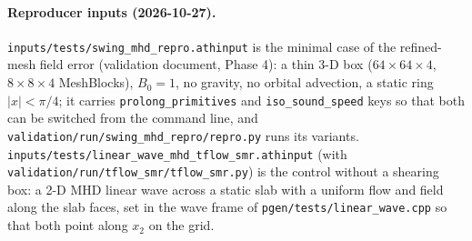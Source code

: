 \documentclass[11pt]{article}
\newcommand{\code}[1]{\texttt{#1}}
\newcommand{\file}[1]{\texttt{\small #1}}
\begin{document}
\paragraph{Reproducer inputs (2026-10-27).} \file{inputs/tests/swing\_mhd\_repro.athinput} is
the minimal case of the refined-mesh field error (validation document, Phase 4): a thin 3-D
box ($64\times64\times4$, $8\times8\times4$ MeshBlocks), $B_0 = 1$, no gravity, no orbital
advection, a static ring $|x| < \pi/4$; it carries \code{prolong\_primitives} and
\code{iso\_sound\_speed} keys so that both can be switched from the command line, and
\file{validation/run/swing\_mhd\_repro/repro.py} runs its variants.
\file{inputs/tests/linear\_wave\_mhd\_tflow\_smr.athinput} (with
\file{validation/run/tflow\_smr/tflow\_smr.py}) is the control without a shearing box: a 2-D
MHD linear wave across a static slab with a uniform flow and field along the slab faces,
set in the wave frame of \file{pgen/tests/linear\_wave.cpp} so that both point along $x_2$ on
the grid.
\end{document}
